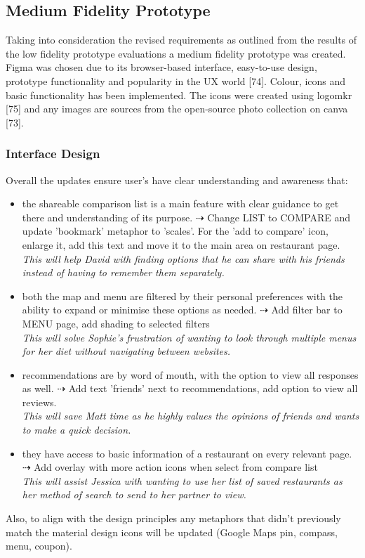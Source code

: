 \documentclass[a4 paper, 12pt]{article}
\begin{document}
\subsection{Medium Fidelity Prototype}
Taking into consideration the revised requirements as outlined from the results of the low fidelity prototype evaluations a medium fidelity prototype was created. Figma was chosen due to its browser-based interface, easy-to-use design, prototype functionality and popularity in the UX world [74]. Colour, icons and basic functionality has been implemented. The icons were created using logomkr [75] and any images are sources from the open-source photo collection on canva [73].

    \subsubsection{Interface Design}
    Overall the updates ensure user's have clear understanding and awareness that:
        \begin{itemize}
            \item the shareable comparison list is a main feature with clear guidance to get there and understanding of its purpose. $\dashrightarrow$ Change LIST to COMPARE and update 'bookmark' metaphor to 'scales'. For the 'add to compare' icon, enlarge it, add this text and move it to the main area on restaurant page.
            \\ \textit{This will help David with finding options that he can share with his friends instead of having to remember them separately.} 
            \item both the map and menu are filtered by their personal preferences with the ability to expand or minimise these options as needed. $\dashrightarrow$ Add filter bar to MENU page, add shading to selected filters \\ 
            \textit{This will solve Sophie's frustration of wanting to look through multiple menus for her diet without navigating between websites.}
            \item recommendations are by word of mouth, with the option to view all responses as well. $\dashrightarrow$ Add text 'friends' next to recommendations, add option to view all reviews. \\
            \textit{This will save Matt time as he highly values the opinions of friends and wants to make a quick decision.}
            \item they have access to basic information of a restaurant on every relevant page. $\dashrightarrow$ Add overlay with more action icons when select from compare list \\
            \textit{This will assist Jessica with wanting to use her list of saved restaurants as her method of search to send to her partner to view.}
        \end{itemize}
        Also, to align with the design principles any metaphors that didn't previously match the material design icons will be updated (Google Maps pin, compass, menu, coupon).
        
\end{document}
